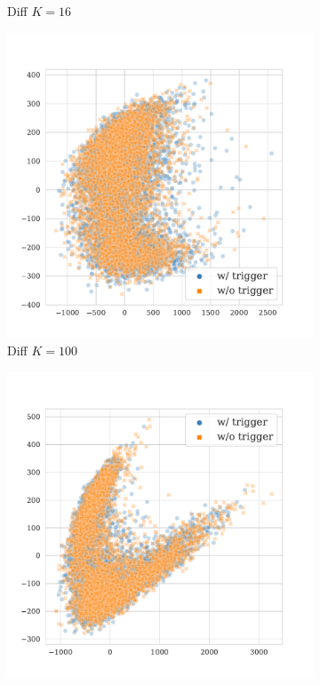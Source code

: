 \begin{figure}[!ht]
\begin{subfigure}{.33\textwidth}
  \caption{Diff $K = 16$}
  \label{fig:mnli_matched_diff_k16_embed}
\end{subfigure}%
\begin{subfigure}{.33\textwidth}
  \centering
  \includegraphics[width=\linewidth]{figures/evaluation_media/mnli-matched-roberta-large-visual-backdoor-diff-prompt-k100-seed42-poison-cf-1715.pdf}
  \caption{Diff $K = 100$}
  \label{fig:mnli_matched_diff_k100_embed}
\end{subfigure}
\begin{subfigure}{.33\textwidth}
  \centering
  \includegraphics[width=\linewidth]{figures/evaluation_media/mnli-matched-roberta-large-visual-backdoor-diff-prompt-k1000-seed42-poison-cf-1724.pdf}

\end{subfigure}
\end{figure}

